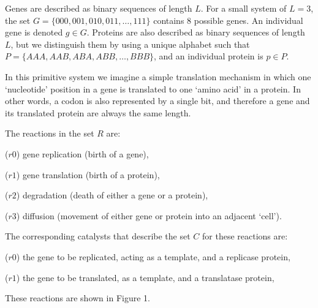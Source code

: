 \documentclass{article}
\begin{document}
Genes are described as binary sequences of length $L$.  For a small system of $L=3$, the set $G = \{000, 001, 010, 011, \dots, 111\}$ contains 8 possible genes.  An individual gene is denoted $g \in G$. Proteins are also described as binary sequences of length $L$, but we distinguish them by using a unique alphabet such that $P = \{AAA, AAB, ABA, ABB, \dots, BBB\}$, and an individual protein is $p \in P$. 

In this primitive system we imagine a simple translation mechanism in which one `nucleotide' position in a gene is translated to one `amino acid' in a protein.  In other words, a codon is also represented by a single bit, and therefore a gene and its translated protein are always the same length.

The reactions in the set $R$ are:  

\hspace{3mm} ($r0$) gene replication (birth of a gene), 

\hspace{3mm} ($r1$) gene translation (birth of a protein),
 
\hspace{3mm} ($r2$) degradation (death of either a gene or a protein), 

\hspace{3mm} ($r3$) diffusion (movement of either gene or protein into an adjacent `cell').

The corresponding catalysts that describe the set $C$ for these reactions are:

\hspace{3mm} ($r0$) the gene to be replicated, acting as a template, and a replicase protein,

\hspace{3mm} ($r1$) the gene to be translated, as a template, and a translatase protein,

These reactions are shown in Figure 1.
\end{document}
